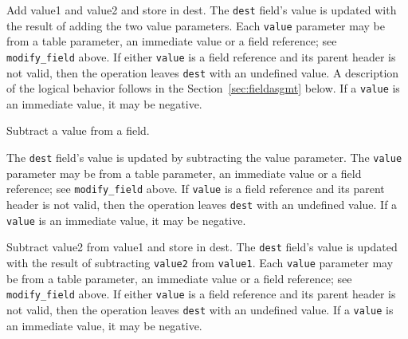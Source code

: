 \documentclass[12pt]{article}
\begin{document}

{ %
Add value1 and value2 and store in dest.
}
{ %
}
{ %
The \texttt{dest} field's value is updated with the result of adding
the two value parameters. Each \texttt{value} parameter may be from a
table parameter, an immediate value or a field reference; see \texttt{modify_field} above. If either \texttt{value}
is a field reference and its parent header is not valid, then
the operation leaves \texttt{dest} with an undefined value.  A description of the logical
behavior follows in the Section~\ref{sec:fieldasgmt} below.  If a
\texttt{value} is an immediate value, it may be negative.
}


{ %
Subtract a value from a field.
}
{ %
}
{ %
The \texttt{dest} field's value is updated by subtracting the value parameter. The \texttt{value} parameter 
may be from a table parameter, an immediate value or a field reference; see \texttt{modify_field} above.  
If \texttt{value} is a field reference 
and its parent header is not valid, then the operation leaves \texttt{dest} with an undefined value.
If a \texttt{value} is an immediate value, it may be negative.

}


{ %
Subtract value2 from value1 and store in dest.
}
{ %
}
{ %
The \texttt{dest} field's value is updated with the result of subtracting
\texttt{value2} from \texttt{value1}. Each \texttt{value} parameter may be from a
table parameter, an immediate value or a field reference; see \texttt{modify_field} above.  If either \texttt{value}
is a field reference and its parent header is not valid, then the operation
leaves \texttt{dest} with an undefined value. If a
\texttt{value} is an immediate value, it may be negative.
}
\end{document}

